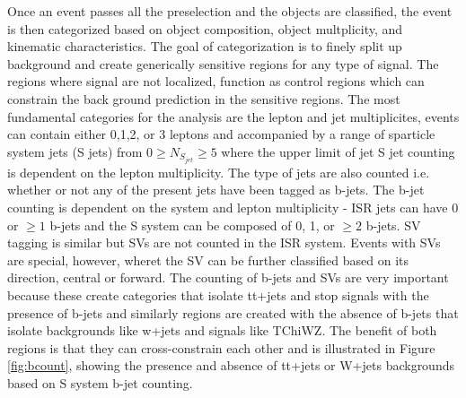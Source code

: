 Once an event passes all the preselection and the objects are classified, the event is then categorized based on object composition, object multplicity, and kinematic characteristics. The goal of categorization is to finely split up background and create generically sensitive regions for any type of signal. The regions where signal are not localized, function as control regions which can constrain the back ground prediction in the sensitive regions. The most fundamental categories for the analysis are the lepton and jet multiplicites, events can contain either 0,1,2, or 3 leptons and accompanied by a range of sparticle system jets (S jets) from $0\geq N_{S_{jet}} \geq 5$ where the upper limit of jet S jet counting is dependent on the lepton multiplicity. The type of jets are also counted i.e. whether or not any of the present jets have been tagged as b-jets. The b-jet counting is dependent on the system and lepton multiplicity - ISR jets can have 0 or $\geq 1$ b-jets and the S system can be composed of 0, 1, or $\geq2$ b-jets. SV tagging is similar but SVs are not counted in the ISR system. Events with SVs are special, however, wheret the SV can be further classified based on its direction, central or forward. The counting of b-jets and SVs are very important because these create categories that isolate tt+jets and stop signals with the presence of b-jets and similarly regions are created with the absence of b-jets that isolate backgrounds like w+jets and signals like TChiWZ. The benefit of both regions is that they can cross-constrain each other and is illustrated in Figure \ref{fig:bcount}, showing the presence and absence of tt+jets or W+jets backgrounds based on S system b-jet counting.

